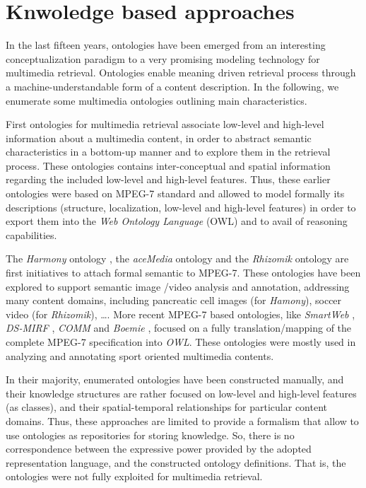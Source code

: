 \section{Knwoledge based approaches}

	In the last fifteen years, ontologies have been emerged from an interesting conceptualization paradigm to a very promising 		modeling technology for multimedia retrieval. Ontologies enable meaning driven retrieval process through a 
	machine-understandable form of a content description. In the following, we enumerate some multimedia ontologies outlining main 		characteristics.

	First ontologies for multimedia retrieval associate low-level and high-level information about a multimedia content, 
	in order to abstract semantic characteristics in a bottom-up manner and to explore them in the retrieval process. 
	These ontologies contains inter-conceptual and spatial information regarding the included low-level and high-level 
	features. Thus, these earlier ontologies were based on MPEG-7 standard and allowed to model formally its descriptions
	(structure, localization, low-level and high-level features) in order to export them into the \emph{Web Ontology Language} 
	(OWL) \citep{Staab2009} and to avail of reasoning capabilities.

	The \emph{Harmony} ontology \citep{Hunter2001}, the \emph{aceMedia} ontology \citep{Petridis2004} and the 
	\emph{Rhizomik} \citep{Garcia2005}  ontology are first initiatives to attach formal semantic to MPEG-7. 
	These ontologies have been explored to support semantic image /video analysis and annotation, addressing 
	many content domains, including pancreatic cell images  (for \emph{Hamony}),  soccer video (for 
	\emph{Rhizomik}), \dots.  More recent MPEG-7 based ontologies, like \emph{SmartWeb} \citep{Oberle2007},
	\emph{DS-MIRF} \citep{Tsinaraki2007}, \emph{COMM} \citep{Arndt2007} and \emph{Boemie} \citep{Dasiopoulou2009}, 
	focused on a fully translation/mapping of the complete MPEG-7 specification into \emph{OWL}. These ontologies 
	were mostly used in analyzing and annotating sport oriented multimedia contents.

	In their majority, enumerated ontologies have been constructed manually, and their knowledge structures 
	are rather focused on low-level and high-level features (as classes), and their spatial-temporal relationships 
	for particular content domains. Thus, these approaches are limited to provide a formalism that allow
	to use ontologies as repositories for storing knowledge. So, there is no correspondence between the 
	expressive power provided by the adopted representation language, and the constructed ontology 
	definitions. That is, the ontologies were not fully exploited for multimedia retrieval.

